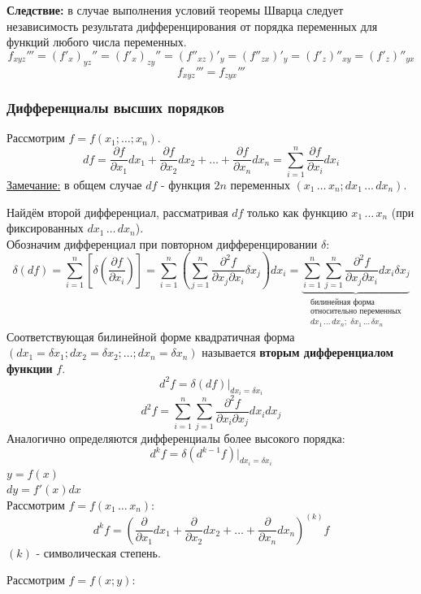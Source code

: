 \documentclass[12pt]{article}
\begin{document}
    \textbf{Следствие:} в случае выполнения условий теоремы Шварца следует независимость результата дифференцирования от порядка переменных для функций любого числа переменных.
    \[ f_{xyz}''' = (f'_x)_{yz}'' = (f'_x)_{zy}'' = (f''_{xz})'_y = (f''_{zx})'_y = (f'_z)''_{xy} = (f'_z)''_{yx} \]
    \[ f_{xyz}''' = f_{zyx}''' \]
    \subsubsection*{Дифференциалы высших порядков}
    Рассмотрим $f = f(x_1; \dots; x_n)$.
    \[ df = \frac{\partial f}{\partial x_1}dx_1 + \frac{\partial f}{\partial x_2}dx_2 + \dots + \frac{\partial f}{\partial x_n}dx_n = \sum_{i=1}^{n}\frac{\partial f}{\partial x_i}dx_i \]
    \underline{Замечание:} в общем случае $df$ - функция $2n$ переменных $(x_1\, \dots\, x_n; dx_1\, \dots\, dx_n)$.\par\noindent
    Найдём второй дифференциал, рассматривая $df$ только как функцию $x_1\, \dots\, x_n$ (при фиксированных $dx_1\, \dots\, dx_n$).\\
    Обозначим дифференциал при повторном дифференцировании $\delta$:
    \[ \delta(df) = \sum_{i=1}^{n}\left[ \delta(\frac{\partial f}{\partial x_i}) \right] = \sum_{i=1}^{n} ( \sum_{j=1}^{n} \frac{\partial^2 f}{\partial x_j \partial x_i} \delta x_j )dx_i = \underbrace{\sum_{i=1}^{n} \sum_{j=1}^{n} \frac{\partial^2 f}{\partial x_j \partial x_i} dx_i \delta x_j}_{\substack{\text{билинейная форма} \\ \text{относительно переменных} \\ dx_1\, \dots\, dx_n;\,\, \delta x_1\, \dots\, \delta x_n}} \]
    Соответствующая билинейной форме квадратичная форма $(dx_1 = \delta x_1; dx_2 = \delta x_2; \dots; dx_n = \delta x_n)$ называется \textbf{вторым дифференциалом функции} $f$.
    \[ d^2 f = \delta (df) \Big|_{dx_i = \delta x_i} \]
    \[ d^2 f = \sum_{i=1}^{n} \sum_{j=1}^{n} \frac{\partial^2 f}{\partial x_i \partial x_j} dx_i dx_j \]
    Аналогично определяются дифференциалы более высокого порядка:
    \[ d^k f = \delta(d^{k-1}f)\Big|_{dx_i = \delta x_i} \]
    $y = f(x)$\\
    $dy = f'(x)dx$\\
    Рассмотрим $f = f(x_1\, \dots\, x_n)$:
    \[ d^k f = \left( \frac{\partial}{\partial x_1} dx_1 + \frac{\partial}{\partial x_2} dx_2 + \dots + \frac{\partial}{\partial x_n} dx_n \right)^{(k)}f \]
    $(k)$ - символическая степень.\par\noindent
    Рассмотрим $f = f(x;y)$:
\end{document}
